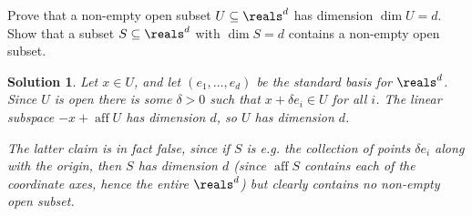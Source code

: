 \documentclass[article, a4paper, 11pt, oneside]{memoir}
\numberwithin{equation}{chapter}
\theoremstyle{nonumberplain}
\newtheorem{solution}{Solution}
\begin{document}
\begin{exerciseframed*}[12]
    Prove that a non-empty open subset $U \subseteq \reals^d$ has dimension $\dim U = d$. Show that a subset $S \subseteq \reals^d$ with $\dim S = d$ contains a non-empty open subset.
\end{exerciseframed*}

\newcommand{\aff}{\operatorname{aff}}

\begin{solution}
    Let $x \in U$, and let $(e_1, \ldots, e_d)$ be the standard basis for $\reals^d$. Since $U$ is open there is some $\delta > 0$ such that $x + \delta e_i \in U$ for all $i$. The linear subspace $-x + \aff U$ has dimension $d$, so $U$ has dimension $d$.

    The latter claim is in fact false, since if $S$ is e.g. the collection of points $\delta e_i$ along with the origin, then $S$ has dimension $d$ (since $\aff S$ contains each of the coordinate axes, hence the entire $\reals^d$) but clearly contains no non-empty open subset.
\end{solution}
\end{document}
